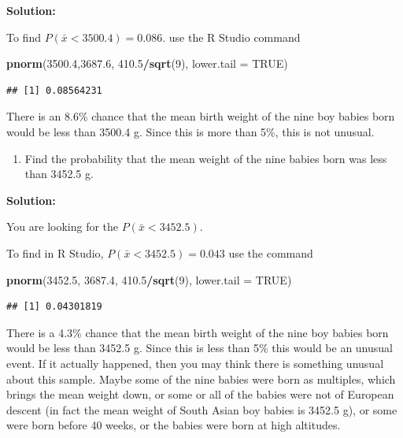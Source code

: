 \documentclass[]{book}
\newenvironment{Shaded}{\begin{snugshade}}{\end{snugshade}}
\newcommand{\DataTypeTok}[1]{\textcolor[rgb]{0.13,0.29,0.53}{#1}}
\newcommand{\DecValTok}[1]{\textcolor[rgb]{0.00,0.00,0.81}{#1}}
\newcommand{\FloatTok}[1]{\textcolor[rgb]{0.00,0.00,0.81}{#1}}
\newcommand{\KeywordTok}[1]{\textcolor[rgb]{0.13,0.29,0.53}{\textbf{#1}}}
\newcommand{\NormalTok}[1]{#1}
\newcommand{\OperatorTok}[1]{\textcolor[rgb]{0.81,0.36,0.00}{\textbf{#1}}}
\newcommand{\OtherTok}[1]{\textcolor[rgb]{0.56,0.35,0.01}{#1}}
\providecommand{\tightlist}{%
  \setlength{\itemsep}{0pt}\setlength{\parskip}{0pt}}
\begin{document}
\textbf{Solution:}

To find \(P(\bar{x}<3500.4)=0.086\). use the R Studio command

\begin{Shaded}
\begin{Highlighting}[]
\KeywordTok{pnorm}\NormalTok{(}\FloatTok{3500.4}\NormalTok{,}\FloatTok{3687.6}\NormalTok{, }\FloatTok{410.5}\OperatorTok{/}\KeywordTok{sqrt}\NormalTok{(}\DecValTok{9}\NormalTok{), }\DataTypeTok{lower.tail =} \OtherTok{TRUE}\NormalTok{)}
\end{Highlighting}
\end{Shaded}

\begin{verbatim}
## [1] 0.08564231
\end{verbatim}

There is an 8.6\% chance that the mean birth weight of the nine boy babies born would be less than 3500.4 g. Since this is more than 5\%, this is not unusual.

\begin{enumerate}
\def\labelenumi{\alph{enumi}.}
\setcounter{enumi}{5}
\tightlist
\item
  Find the probability that the mean weight of the nine babies born was less than 3452.5 g.
\end{enumerate}

\textbf{Solution:}

You are looking for the \(P(\bar{x}<3452.5)\).

To find in R Studio, \(P(\bar{x}<3452.5)=0.043\) use the command

\begin{Shaded}
\begin{Highlighting}[]
\KeywordTok{pnorm}\NormalTok{(}\FloatTok{3452.5}\NormalTok{, }\FloatTok{3687.4}\NormalTok{, }\FloatTok{410.5}\OperatorTok{/}\KeywordTok{sqrt}\NormalTok{(}\DecValTok{9}\NormalTok{), }\DataTypeTok{lower.tail =} \OtherTok{TRUE}\NormalTok{)}
\end{Highlighting}
\end{Shaded}

\begin{verbatim}
## [1] 0.04301819
\end{verbatim}

There is a 4.3\% chance that the mean birth weight of the nine boy babies born would be less than 3452.5 g. Since this is less than 5\% this would be an unusual event. If it actually happened, then you may think there is something unusual about this sample. Maybe some of the nine babies were born as multiples, which brings the mean weight down, or some or all of the babies were not of European descent (in fact the mean weight of South Asian boy babies is 3452.5 g), or some were born before 40 weeks, or the babies were born at high altitudes.
\end{document}
